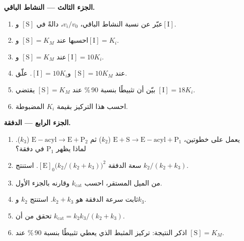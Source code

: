 \begin{problem}
\medskip\noindent\textbf{الجزء الثالث --- النشاط الباقي.}
\begin{enumerate}[resume]
  \item عبّر عن نسبة النشاط الباقي، $v_i/v_0$، دالةً في $[\mathrm S]$ 
        و$[\mathrm I]$.
  \item احسبها عند $[\mathrm S] = K_M$ و$[\mathrm I] = K_i$.
  \item عند $[\mathrm S] = K_M$ و$[\mathrm I] = 10K_i$.
  \item عند $[\mathrm S] = 10K_M$ و$[\mathrm I] = 10K_i$. علّق.
  \item بيّن أن تثبيطًا بنسبة 90\,\% عند $[\mathrm S] = K_M$ يقتضي $[\mathrm I] = 18K_i$.
  \item احسب هذا التركيز بقيمة $K_i$ المضبوطة.
\end{enumerate}

\medskip\noindent\textbf{الجزء الرابع --- الدفقة.}
\begin{enumerate}[resume]
  \item يعمل  على خطوتين، $\mathrm{E + S \to E{-}acyl + P_1}$ ($k_2$) ثم $\mathrm{E{-}acyl \to E +
        P_2}$ ($k_3$). لماذا يظهر $\mathrm P_1$ في دفقة؟
  \item سعة الدفقة $[\mathrm E]_0\bigl(k_2/(k_2 + k_3)\bigr)^2$. استنتج $k_2/(k_2 + k_3)$.
  \item من الميل المستقر، احسب $k_{\mathrm{cat}}$ وقارنه بالجزء الأول.
  \item ثابت سرعة الدفقة هو $k_2 + k_3$. استنتج $k_2$ و$k_3$.
  \item تحقق من أن $k_{\mathrm{cat}} = k_2k_3/(k_2 + k_3)$.
  \item اذكر النتيجة: تركيز المثبط الذي يعطي تثبيطًا بنسبة 90\,\% عند
        $[\mathrm S] = K_M$.
\end{enumerate}
\end{problem}
